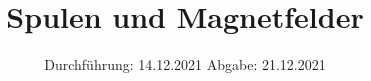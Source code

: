 

\subject{V308}
\title{Spulen und Magnetfelder}
\date{%
  Durchführung: 14.12.2021
  \hspace{3em}
  Abgabe: 21.12.2021
}



\maketitle
\thispagestyle{empty}
\tableofcontents
\newpage






\printbibliography{}





